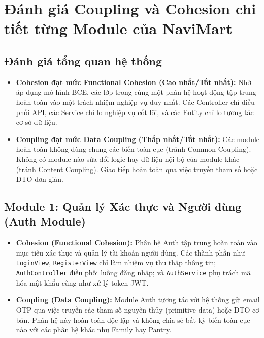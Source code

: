 \documentclass[12pt,a4paper]{article}
\begin{document}
\section{Đánh giá Coupling và Cohesion chi tiết từng Module của NaviMart}

\subsection{Đánh giá tổng quan hệ thống}
\begin{itemize}
    \item \textbf{Cohesion đạt mức Functional Cohesion (Cao nhất/Tốt nhất):} Nhờ áp dụng mô hình BCE, các lớp trong cùng một phân hệ hoạt động tập trung hoàn toàn vào một trách nhiệm nghiệp vụ duy nhất. Các Controller chỉ điều phối API, các Service chỉ lo nghiệp vụ cốt lõi, và các Entity chỉ lo tương tác cơ sở dữ liệu.
    \item \textbf{Coupling đạt mức Data Coupling (Thấp nhất/Tốt nhất):} Các module hoàn toàn không dùng chung các biến toàn cục (tránh Common Coupling). Không có module nào sửa đổi logic hay dữ liệu nội bộ của module khác (tránh Content Coupling). Giao tiếp hoàn toàn qua việc truyền tham số hoặc DTO đơn giản.
\end{itemize}

\subsection{Module 1: Quản lý Xác thực và Người dùng (Auth Module)}
\begin{itemize}
    \item \textbf{Cohesion (Functional Cohesion):} Phân hệ Auth tập trung hoàn toàn vào mục tiêu xác thực và quản lý tài khoản người dùng. Các thành phần như \texttt{LoginView}, \texttt{RegisterView} chỉ làm nhiệm vụ thu thập thông tin; \texttt{AuthController} điều phối luồng đăng nhập; và \texttt{AuthService} phụ trách mã hóa mật khẩu cũng như xử lý token JWT.
    \item \textbf{Coupling (Data Coupling):} Module Auth tương tác với hệ thống gửi email OTP qua việc truyền các tham số nguyên thủy (primitive data) hoặc DTO cơ bản. Phân hệ này hoàn toàn độc lập và không chia sẻ bất kỳ biến toàn cục nào với các phân hệ khác như Family hay Pantry.
\end{itemize}
\end{document}
